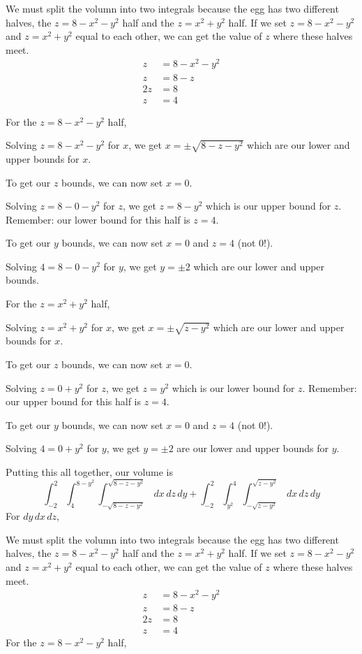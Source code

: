 \documentclass{article}
\begin{document}
We must split the volumn into two integrals because the egg has two different halves, the $z=8-x^2-y^2$ half and the $z=x^2+y^2$ half. If we set $z=8-x^2-y^2$ and $z=x^2+y^2$ equal to each other, we can get the value of $z$ where these halves meet.
\begin{align*}
    z&=8-x^2-y^2\\
    z&=8-z\tag{we know $z=x^2+y^2$}\\
    2z&=8\\
    z&=4
\end{align*}

For the $z=8-x^2-y^2$ half, 

Solving $z=8-x^2-y^2$ for $x$, we get $x=\pm \sqrt{8-z-y^2}$ which are our lower and upper bounds for $x$.

To get our $z$ bounds, we can now set $x=0$.

Solving $z=8-0-y^2$ for $z$, we get $z=8-y^2$ which is our upper bound for $z$. Remember: our lower bound for this half is $z=4$.

To get our $y$ bounds, we can now set $x=0$ and $z=4$ (not $0$!).

Solving $4=8-0-y^2$ for $y$, we get $y=\pm 2$ which are our lower and upper bounds.

For the $z=x^2+y^2$ half,

Solving $z=x^2+y^2$ for $x$, we get $x=\pm\sqrt{z-y^2}$ which are our lower and upper bounds for $x$.

To get our $z$ bounds, we can now set $x=0$.

Solving $z=0+y^2$ for $z$, we get $z=y^2$ which is our lower bound for $z$. Remember: our upper bound for this half is $z=4$.

To get our $y$ bounds, we can now set $x=0$ and $z=4$ (not $0$!).

Solving $4=0+y^2$ for $y$, we get $y=\pm2$ are our lower and upper bounds for $y$.

Putting this all together, our volume is
\begin{equation*}
    \int_{-2}^{2}\int_4^{8-y^2}\int_{-\sqrt{8-z-y^2}}^{\sqrt{8-z-y^2}}\,dx\,dz\,dy+\int_{-2}^2\int_{y^2}^4\int_{-\sqrt{z-y^2}}^{\sqrt{z-y^2}}\,dx\,dz\,dy
\end{equation*}
For $dy\,dx\,dz$,

We must split the volumn into two integrals because the egg has two different halves, the $z=8-x^2-y^2$ half and the $z=x^2+y^2$ half. If we set $z=8-x^2-y^2$ and $z=x^2+y^2$ equal to each other, we can get the value of $z$ where these halves meet.
\begin{align*}
    z&=8-x^2-y^2\\
    z&=8-z\tag{we know $z=x^2+y^2$}\\
    2z&=8\\
    z&=4
\end{align*}
For the $z=8-x^2-y^2$ half,
\end{document}
